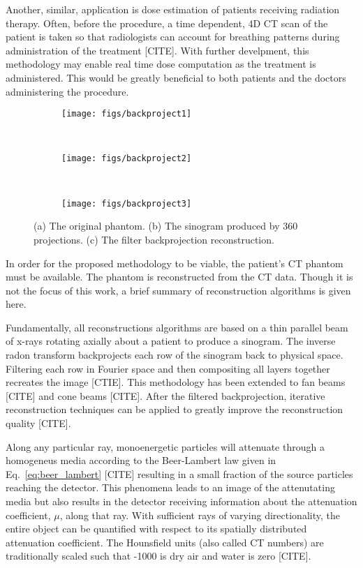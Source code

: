 Another, similar, application is dose estimation of patients receiving radiation therapy. Often, before the procedure, a time dependent, 4D CT scan of the patient is taken so that radiologists can account for breathing patterns during administration of the treatment [CITE]. With further develpment, this methodology may enable real time dose computation as the treatment is administered. This would be greatly beneficial to both patients and the doctors administering the procedure.

\begin{figure}
    \centering
    \begin{subfigure}[b]{0.38\textwidth}
        \texttt{[image: figs/backproject1]}
        \caption{}
        \label{fig:beamconexy}
    \end{subfigure}
    ~
    \begin{subfigure}[b]{0.19\textwidth}
        \texttt{[image: figs/backproject2]}
        \caption{}
        \label{fig:beamfanxy}
    \end{subfigure}
    ~
    \begin{subfigure}[b]{0.38\textwidth}
        \texttt{[image: figs/backproject3]}
        \caption{}
        \label{fig:subsweep_general3}
    \end{subfigure}
    \caption{(a) The original phantom. (b) The sinogram produced by 360 projections. (c) The filter backprojection reconstruction.}\label{fig:backprojection}
\end{figure}

In order for the proposed methodology to be viable, the patient's CT phantom must be available. The phantom is reconstructed from the CT data. Though it is not the focus of this work, a brief summary of reconstruction algorithms is given here.

Fundamentally, all reconstructions algorithms are based on a thin parallel beam of x-rays rotating axially about a patient to produce a sinogram. The inverse radon transform backprojects each row of the sinogram back to physical space. Filtering each row in Fourier space and then compositing all layers together recreates the image [CTIE]. This methodology has been extended to fan beams [CITE] and cone beams [CITE]. After the filtered backprojection, iterative reconstruction techniques can be applied to greatly improve the reconstruction quality [CITE].

Along any particular ray, monoenergetic particles will attenuate through a homogeneus media according to the Beer-Lambert law given in Eq.~\ref{eq:beer_lambert} [CITE] resulting in a small fraction of the source particles reaching the detector. This phenomena leads to an image of the attenutating media but also results in the detector receiving information about the attenuation coefficient, $\mu$, along that ray. With sufficient rays of varying directionality, the entire object can be quantified with respect to its spatially distributed attenuation coefficient. The Hounsfield units (also called CT numbers) are traditionally scaled such that -1000 is dry air and water is zero [CITE].

